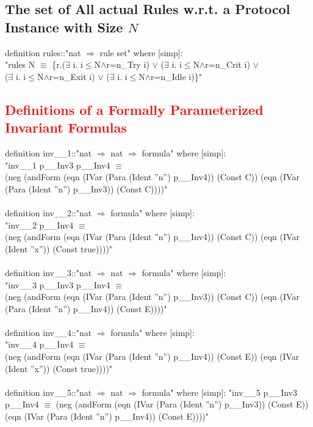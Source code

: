\documentclass{llncs}
\newcommand\lyj[1]{\textcolor{red}{ #1} }
\begin{document}
\subsection{The set of All actual Rules w.r.t. a Protocol Instance with Size $N$}
definition rules::"nat $\Rightarrow$ rule set" where [simp]:\\
"rules N $\equiv$ \{r.($\exists$ i. i$\le$N$\wedge$r=n\_Try  i) $\vee$
($\exists$ i. i$\le$N$\wedge$r=n\_Crit  i) $\vee$\\
($\exists$ i. i$\le$N$\wedge$r=n\_Exit  i) $\vee$
($\exists$ i. i$\le$N$\wedge$r=n\_Idle  i)\}"\\
\subsection{\lyj{Definitions of a Formally Parameterized Invariant Formulas}
\label{subsec:formalinvariant formulas } }
definition inv\_\_1::"nat $\Rightarrow$ nat $\Rightarrow$ formula" where [simp]:\\
"inv\_\_1 p\_\_Inv3 p\_\_Inv4 $\equiv$\\
(neg (andForm (eqn (IVar (Para (Ident ''n'') p\_\_Inv4)) (Const C)) (eqn (IVar (Para (Ident ''n'') p\_\_Inv3)) (Const C))))"\\
\\
definition inv\_\_2::"nat $\Rightarrow$ formula" where [simp]:\\
"inv\_\_2 p\_\_Inv4 $\equiv$\\
(neg (andForm (eqn (IVar (Para (Ident ''n'') p\_\_Inv4)) (Const C)) (eqn (IVar (Ident ''x'')) (Const true))))"\\
\\
definition inv\_\_3::"nat $\Rightarrow$ nat $\Rightarrow$ formula" where [simp]:\\
"inv\_\_3 p\_\_Inv3 p\_\_Inv4 $\equiv$\\
(neg (andForm (eqn (IVar (Para (Ident ''n'') p\_\_Inv3)) (Const C)) (eqn (IVar (Para (Ident ''n'') p\_\_Inv4)) (Const E))))"\\
\\
definition inv\_\_4::"nat $\Rightarrow$ formula" where [simp]:\\
"inv\_\_4 p\_\_Inv4 $\equiv$\\
(neg (andForm (eqn (IVar (Para (Ident ''n'') p\_\_Inv4)) (Const E)) (eqn (IVar (Ident ''x'')) (Const true))))"\\
\\
definition inv\_\_5::"nat $\Rightarrow$ nat $\Rightarrow$ formula" where [simp]:
"inv\_\_5 p\_\_Inv3 p\_\_Inv4 $\equiv$
(neg (andForm (eqn (IVar (Para (Ident ''n'') p\_\_Inv3)) (Const E)) (eqn (IVar (Para (Ident ''n'') p\_\_Inv4)) (Const E))))"
\\
\end{document}
